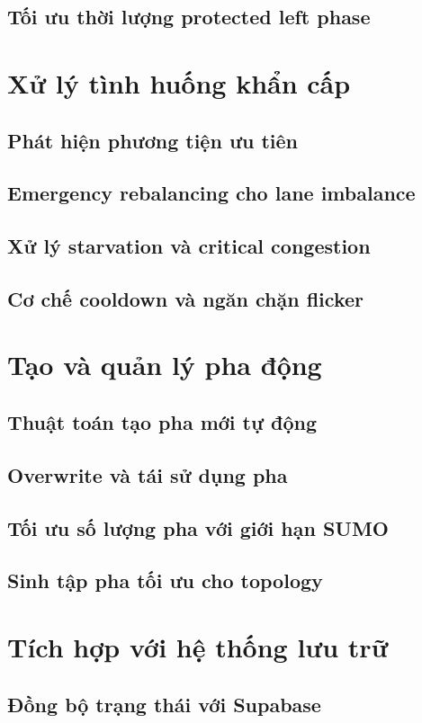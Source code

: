 \documentclass[12pt,a4paper,oneside]{report}
\begin{document}
\subsection{Tối ưu thời lượng protected left phase}

\section{Xử lý tình huống khẩn cấp}
\subsection{Phát hiện phương tiện ưu tiên}
\subsection{Emergency rebalancing cho lane imbalance}
\subsection{Xử lý starvation và critical congestion}
\subsection{Cơ chế cooldown và ngăn chặn flicker}

\section{Tạo và quản lý pha động}
\subsection{Thuật toán tạo pha mới tự động}
\subsection{Overwrite và tái sử dụng pha}
\subsection{Tối ưu số lượng pha với giới hạn SUMO}
\subsection{Sinh tập pha tối ưu cho topology}

\section{Tích hợp với hệ thống lưu trữ}
\subsection{Đồng bộ trạng thái với Supabase}
\end{document}
